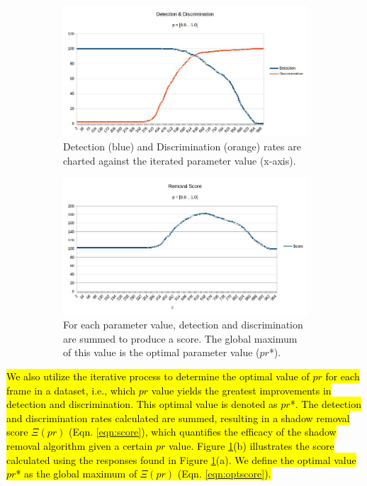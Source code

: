 \documentclass[12pt]{report}
\begin{document}
\begin{figure}
  \centering
  \begin{subfigure}{1\linewidth}
  	\includegraphics[width=1\linewidth]{figures/campus_dd.jpg}
  \caption{Detection (blue) and Discrimination (orange) rates are charted against the iterated parameter value (x-axis).}
  \end{subfigure}
  \hfill
  \begin{subfigure}{1\linewidth}
  	\includegraphics[width=1\linewidth]{figures/campus_score.jpg}
  \caption{For each parameter value, detection and discrimination are summed to produce a score. The global maximum of this value is the optimal parameter value ($pr$*).}
  \end{subfigure}
\caption{}
\label{fig:campusddscore}
\end{figure}

\hl{We also utilize the iterative process to determine the optimal value of $pr$ for each frame in a dataset, i.e., which $pr$ value yields the greatest improvements in detection and discrimination. This optimal value is denoted as $pr$*. The detection and discrimination rates calculated are summed, resulting in a shadow removal score $\Xi(pr)$ (Eqn. \ref{eqn:score}), which quantifies the efficacy of the shadow removal algorithm given a certain $pr$ value. Figure \ref{fig:campusddscore}(b) illustrates the score calculated using the responses found in Figure \ref{fig:campusddscore}(a). We define the optimal value $pr$* as the global maximum of $\Xi(pr)$ (Eqn. \ref{eqn:optscore}).}
\end{document}
